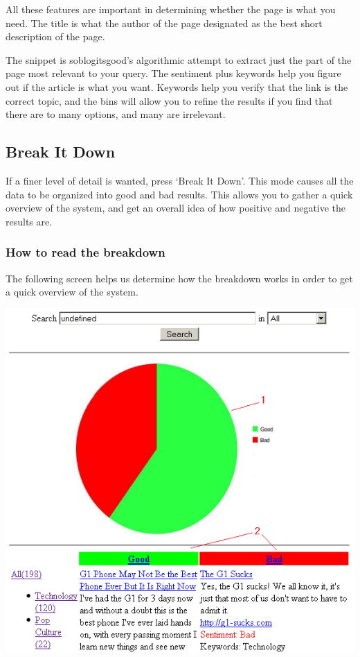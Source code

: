 \documentclass[titlepage]{article}
\begin{document}
All these features are important in determining whether the page is what you
need. The title is what the author of the page designated as the best short
description of the page.

The snippet is \textsf{soblogitsgood}'s algorithmic attempt to extract just the part of the
page most relevant to your query. The sentiment plus keywords help you figure
out if the article is what you want. Keywords help you verify that the link is
the correct topic, and the bins will allow you to refine the results if you
find that there are to many options, and many are irrelevant.

\subsection{Break It Down}
If a finer level of detail is wanted, press `Break It Down'. This mode causes
all the data to be organized into good and bad results. This allows you to
gather a quick overview of the system, and get an overall idea of how positive
and negative the results are.

\subsubsection{How to read the breakdown}
The following screen helps us determine how the breakdown works in order to
get a quick overview of the system.
\begin{center}
\includegraphics{brokendown.png}
\end{center}
\end{document}
